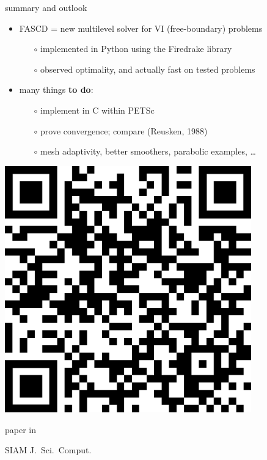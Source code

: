 \documentclass[svgnames,
               hyperref={colorlinks,citecolor=DeepPink4,linkcolor=FireBrick,urlcolor=Maroon},
               usepdftitle=false]  %
               {beamer}
\begin{document}
\begin{frame}{summary and outlook}

\begin{itemize}
\item FASCD = new multilevel solver for VI (free-boundary) problems
    \begin{itemize}
    \item[$\circ$] implemented in Python using the Firedrake library
    \item[$\circ$] observed optimality, and actually fast on tested problems
    \end{itemize}
\item many things \textbf{{\color{FireBrick} to do}}:
    \begin{itemize}
    \item[$\circ$] implement in C within PETSc
    \item[$\circ$] prove convergence; compare (Reusken, 1988)
    \item[$\circ$] mesh adaptivity, better smoothers, parabolic examples, \dots
    \end{itemize}
\end{itemize}

\bigskip\bigskip
\begin{minipage}[T]{0.25\textwidth}
\vspace{0pt}

\includegraphics[width=0.8\textwidth]{figs/QRbuelerfarrell.png}

\scriptsize paper in

SIAM J.~Sci.~Comput.
\end{minipage}
\hfill
\begin{minipage}[T]{0.25\textwidth}
\vspace{0pt}


\end{minipage}
\end{frame}
\end{document}

